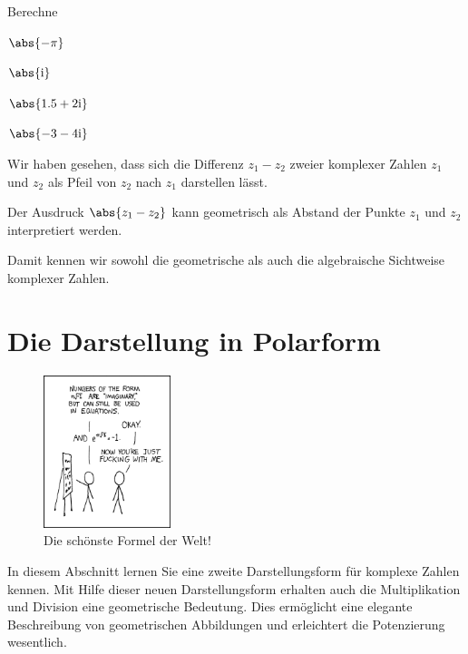 \documentclass[%
11pt,%
twoside,%
titlepage,%
german,%
headsepline%
]{scrartcl}
\begin{document}
\begin{ueb}[abs]
Berechne

\begin{minipage}{3.5cm}
\begin{enumeratea}
\item $\abs{-\pi}$
\item $\abs{\mathrm{i}}$
\end{enumeratea}
\end{minipage}
\begin{minipage}{3.5cm}
\begin{enumeratea}
\setcounter{enumi}{2}
\item $\abs{1.5+2\mathrm{i}}$
\item $\abs{-3-4\mathrm{i}}$
\end{enumeratea}
\end{minipage}
\end{ueb}

Wir haben gesehen, dass sich die Differenz $z_1-z_2$ zweier komplexer Zahlen $z_1$ und $z_2$ als Pfeil von $z_2$ nach $z_1$ darstellen lässt.

\begin{bem}
Der Ausdruck $\abs{z_1-z_2}$ kann geometrisch als Abstand der Punkte $z_1$ und $z_2$ interpretiert werden.
\end{bem}

Damit kennen wir sowohl die geometrische als auch die algebraische Sichtweise
komplexer Zahlen.

\clearpage

\section{Die Darstellung in Polarform}
\begin{figure}
\vspace{-20pt}
  \begin{center}
    \includegraphics[width=0.33\textwidth]{pictures/etotheipi}
  \end{center}
\vspace{-20pt}
\caption{Die sch\"onste Formel der Welt!}
\end{figure}
In diesem Abschnitt lernen Sie eine zweite Darstellungsform f\"ur komplexe Zahlen kennen. Mit Hilfe dieser neuen Darstellungsform erhalten auch die Multiplikation und Division eine geometrische Bedeutung. Dies erm\"oglicht eine elegante Beschreibung von geometrischen Abbildungen und erleichtert die Potenzierung wesentlich.
\end{document}
